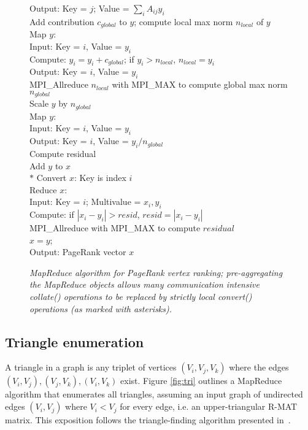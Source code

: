 \begin{figure}[htb]
\begin{center}
{\begin{minipage}{\textwidth}
\begin{tabbing}
\> \> \> Output:  Key = $j$; Value = $\sum_i A_{ij} y_i$ \\
 Add contribution $c_{global}$ to $y$; compute local max norm $n_{local}$ of $y$ \\
\> \> Map $y$:  \\
\> \> \> Input:  Key = $i$, Value = $y_i$ \\
\> \> \> Compute: $y_i = y_i + c_{global}$; if $y_i > {n_{local}}$, $n_{local} = y_i$ \\
\> \> \> Output:  Key = $i$, Value = $y_i$ \\
\> \> MPI\_Allreduce $n_{local}$ with MPI\_MAX to compute global max norm $n_{global}$ \\
 Scale $y$ by $n_{global}$ \\
\> \> Map $y$: \\
\> \> \> Input:  Key = $i$, Value = $y_i$ \\
\> \> \> Output:  Key = $i$, Value = $y_i / {n_{global}}$ \\
 Compute residual \\
\> \> Add $y$ to $x$ \\
$*$\> \> Convert $x$:  Key is index $i$ \\
\> \> Reduce $x$:   \\
\> \> \> Input:  Key = $i$; Multivalue = $x_i, y_i$ \\
\> \> \> Compute:  if $|x_i - y_i| > {resid}$, ${resid} = |x_i - y_i|$ \\
\> \> MPI\_Allreduce with MPI\_MAX to compute $residual$ \\
 $x = y$; \\
Output: PageRank vector $x$
  \end{tabbing}
 \end{minipage}}\end{center}

 \caption{\it MapReduce algorithm for PageRank vertex ranking;
pre-aggregating the MapReduce objects allows many communication
intensive {\it collate()} operations to be replaced by strictly local
{\it convert()} operations (as marked with asterisks).}

 \label{fig:pr2}
\end{figure}

\subsection{Triangle enumeration}

A triangle in a graph is any triplet of vertices $(V_i,V_j,V_k)$ where
the edges $(V_i,V_j), (V_j,V_k), (V_i,V_k)$ exist.  Figure
\ref{fig:tri} outlines a MapReduce algorithm that enumerates all
triangles, assuming an input graph of undirected edges $(V_i,V_j)$
where $V_i < V_j$ for every edge, i.e. an upper-triangular R-MAT
matrix.  This exposition follows the triangle-finding algorithm
presented in~\cite{Cohen09}.

